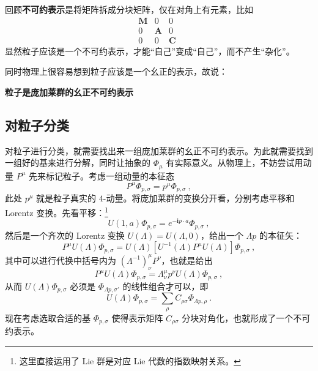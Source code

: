 回顾\textbf{\textbf{不可约表示}}是将矩阵拆成分块矩阵，仅在对角上有元素，比如
\begin{equation}
	\begin{matrix}
		\textbf{M} & 0 & 0 \\
		0 & \textbf{A} & 0 \\
		0 & 0 & \textbf{C} 
	\end{matrix}
     ~~
\end{equation}
显然粒子应该是一个不可约表示，才能“自己”变成“自己”，而不产生“杂化”。

同时物理上很容易想到粒子应该是一个幺正的表示，故说：

\textbf{\textbf{粒子是庞加莱群的幺正不可约表示}}



\subsection{对粒子分类}
对粒子进行分类，就需要找出来一组庞加莱群的幺正不可约表示。为此就需要找到一组好的基来进行分解，同时让抽象的 $\Phi_\mu$ 有实际意义。从物理上，不妨尝试用动量 $P^\mu$ 先来标记粒子。考虑一组动量的本征态 
\begin{equation}
	P^\mu \Phi_{p, \sigma} = p^\mu \Phi_{p, \sigma} ~,
\end{equation}
此处 $p^\mu$ 就是粒子真实的 $4$-动量。将庞加莱群的变换分开看，分别考虑平移和 Lorentz 变换。先看平移：\footnote{这里直接运用了 Lie 群是对应 Lie 代数的指数映射关系。}
\begin{equation}
	U(1, a) \Phi_{p, \sigma} = e^{-\mathbf{i} p \cdot a} \Phi_{p, \sigma} ~,
\end{equation}
然后是一个齐次的 Lorentz 变换 $U(\Lambda) = U(\Lambda, 0)$，给出一个 $\Lambda p$ 的本征矢：
\begin{equation}
	P^\mu U(\Lambda) \Phi_{p, \sigma} = U(\Lambda) [U^{-1}(\Lambda) P^\mu U(\Lambda)] \Phi_{p, \sigma} ~, 
\end{equation}
其中可以进行代换中括号内为 $(\Lambda^{-1})^\mu_{\nu} P^\nu$，也就是给出 
\begin{equation}
	P^\mu U(\Lambda) \Phi_{p, \sigma} = \Lambda_\nu^\mu p^\nu U(\Lambda) \Phi_{p, \sigma} ~,
\end{equation}
从而 $U(\Lambda) \Phi_{p, \sigma}$ 必须是 $\Phi_{\Lambda p, \sigma'}$ 的线性组合才可以，即 
\begin{equation}
	U(\Lambda) \Phi_{p, \sigma} = \sum_{\rho} C_{\rho \sigma} \Phi_{\Lambda p, \rho} ~.
\end{equation}
现在考虑选取合适的基 $\Phi_{p, \sigma}$ 使得表示矩阵 $C_{\rho \sigma}$ 分块对角化，也就形成了一个不可约表示。

